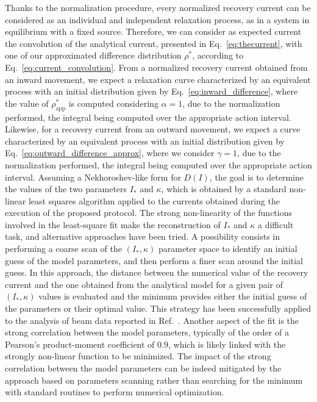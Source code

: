 Thanks to the normalization procedure, every normalized recovery current can be considered as an individual and independent relaxation process, as in a system in equilibrium with a fixed source. Therefore, we can consider as expected current the convolution of the analytical current, presented in Eq.~\eqref{eq:thecurrent}, with one of our approximated difference distribution $\rho^\ast$, {according to Eq.~\eqref{eq:current_convolution}}. From a normalized recovery current obtained from an inward movement, we expect a relaxation curve characterized by an equivalent process with an initial distribution given by Eq.~\eqref{eq:inward_difference}, where the value of $\rho^\ast_\text{app}$ is computed considering $\alpha=1$, due to the normalization performed, the integral being computed over the appropriate action interval. Likewise, for a recovery current from an outward movement, we expect a curve characterized by an equivalent process with an initial distribution given by Eq.~\eqref{eq:outward_difference_approx}, where we consider $\gamma=1$, due to the normalization performed, the integral being computed over the appropriate action interval. Assuming a Nekhoroshev-like form for $D(I)$, the goal is to determine the values of the two parameters $I_\ast$ and $\kappa$, which is obtained by a standard non-linear least squares algorithm applied to the currents obtained during the execution of the proposed protocol. {The strong non-linearity of the functions involved in the least-square fit make the reconstruction of $I_\ast$ and $\kappa$ a difficult task, and alternative approaches have been tried. A possibility consists in performing a coarse scan of the $(I_\ast, \kappa)$ parameter space to identify an initial guess of the model parameters, and then perform a finer scan around the initial guess. In this approach, the distance between the numerical value of the recovery current and the one obtained from the analytical model for a given pair of $(I_\ast, \kappa)$ values is evaluated and the minimum provides either the initial guess of the parameters or their optimal value. This strategy has been successfully applied to the analysis of beam data reported in Ref.~\cite{montanari:ipac22-mopost043}. Another aspect of the fit is the strong correlation between the model parameters, typically of the order of a Pearson's product-moment coefficient of $0.9$, which is likely linked with the strongly non-linear function to be minimized. The impact of the strong correlation between the model parameters can be indeed mitigated by the approach based on parameters scanning rather than searching for the minimum with standard routines to perform numerical optimization.}

